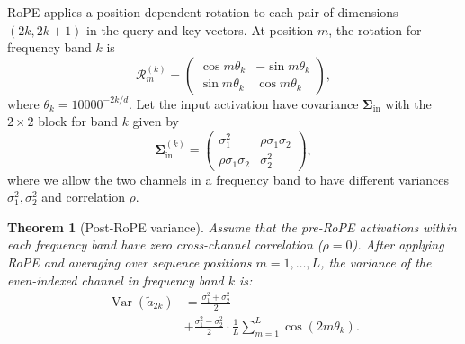 \documentclass[11pt,a4paper]{article}
\newtheorem{theorem}{Theorem}
\DeclareMathOperator{\Var}{Var}
\newcommand{\bSigma}{\boldsymbol{\Sigma}}
\begin{document}
RoPE applies a position-dependent rotation to each pair of dimensions $(2k, 2k{+}1)$ in the query and key vectors.
At position $m$, the rotation for frequency band $k$ is
\[
\mathcal{R}_m^{(k)} = \begin{pmatrix} \cos m\theta_k & -\sin m\theta_k \\ \sin m\theta_k & \cos m\theta_k \end{pmatrix},
\]
where $\theta_k = 10000^{-2k/d}$.
Let the input activation have covariance $\bSigma_{\text{in}}$ with the $2 \times 2$ block for band $k$ given by
\[
\bSigma_{\text{in}}^{(k)} = \begin{pmatrix} \sigma_1^2 & \rho \sigma_1 \sigma_2 \\ \rho \sigma_1 \sigma_2 & \sigma_2^2 \end{pmatrix},
\]
where we allow the two channels in a frequency band to have different variances $\sigma_1^2, \sigma_2^2$ and correlation $\rho$.

\begin{theorem}[Post-RoPE variance]
\label{thm:rope_var}
Assume that the pre-RoPE activations within each frequency band have zero cross-channel correlation ($\rho = 0$).
After applying RoPE and averaging over sequence positions $m = 1, \ldots, L$, the variance of the even-indexed channel in frequency band $k$ is:
\begin{equation}
\label{eq:rope_var}
\begin{split}
\Var(\tilde{a}_{2k}) &= \frac{\sigma_1^2 + \sigma_2^2}{2} \\
&+ \frac{\sigma_1^2 - \sigma_2^2}{2} \cdot \frac{1}{L}\sum_{m=1}^{L} \cos(2m\theta_k).
\end{split}
\end{equation}
\end{theorem}
\end{document}
